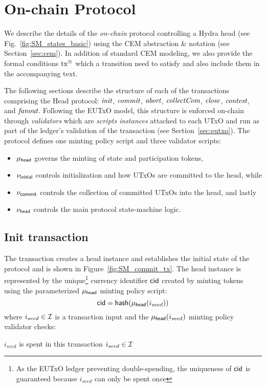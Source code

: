 \section{On-chain Protocol}\label{sec:on-chain}


We describe the details of the \emph{on-chain} protocol controlling a
Hydra head (see Fig.~\ref{fig:SM_states_basic}) using the CEM abstraction \&
notation (see Section~\ref{sec:cem}). In addition of standard CEM modeling, we
also provide the formal conditions $\mathrm{tx}^\equiv$ which a transition need to
satisfy and also include them in the accompanying text.

The following sections describe the structure of each of the transactions
comprising the Head protocol: $\textit{init}{}$, $\textit{commit}{}$, $\textit{abort}{}$,
$\textit{collectCom}{}$, $\textit{close}{}$, $\textit{contest}{}$, and $\textit{fanout}{}$. Following
the EUTxO model, this structure is enforced on-chain through \emph{validators}
which are \emph{scripts instances} attached to each UTxO and run as part of the
ledger's validation of the transaction (see Section~\ref{sec:eutxo}). The
protocol defines one minting policy script and three validator scripts:
\begin{itemize}
  \item $\mu_\mathsf{head}$ governs the minting of state and participation tokens,
  \item $\nu_\mathsf{initial}$ controls initialization and how UTxOs are committed to the head, while
  \item $\nu_\mathsf{commit}$ controls the collection of committed UTxOs into the head, and lastly
  \item $\nu_\mathsf{head}$ controls the main protocol state-machine logic.
\end{itemize}

\subsection{Init transaction}

The \mtxInit{} transaction creates a head instance and establishes the initial
state of the protocol and is shown in Figure~\ref{fig:SM_commit_tx}. The head
instance is represented by the unique\footnote{As the EUTxO ledger preventing
  double-spending, the uniqueness of $\mathsf{cid}$ is guaranteed because $i_{seed}$ can
  only be spent once} currency identifier $\mathsf{cid}$ created by minting tokens using
the parameterized $\mu_\mathsf{head}$ minting policy script:
\[
  \mathsf{cid} = \mathsf{hash}(\mu_\mathsf{head}(i_{seed}))
\]
\noindent where $i_{seed} \in \mathcal{I}$ is a transaction input and the
$\mu_\mathsf{head}(i_{seed})$ minting policy validator checks:
\begin{menumerate}
  \item $i_{seed}$ is spent in this transaction
  $i_{seed} \in \mathcal{I}$
\end{menumerate}

